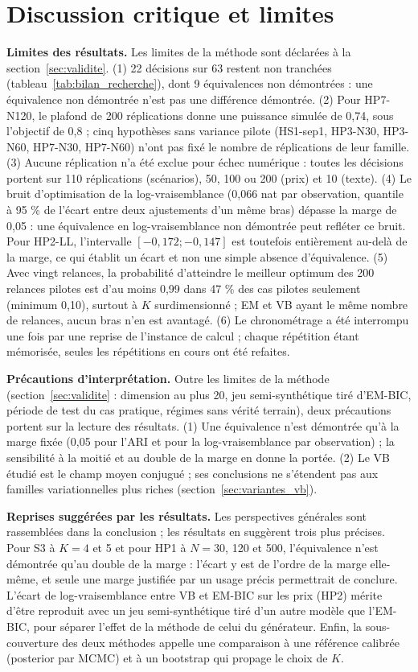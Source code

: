 \section{Discussion critique et limites}\label{sec:discussion_critique}
\textbf{Limites des résultats. }Les limites de la méthode sont déclarées à la section~\ref{sec:validite}.
(1) 22 décisions sur 63 restent non tranchées (tableau~\ref{tab:bilan_recherche}), dont 9 équivalences non démontrées : une équivalence non démontrée n'est pas une différence démontrée. (2) Pour HP7-N120, le plafond de 200 réplications donne une puissance simulée de 0,74, sous l'objectif de 0,8 ; cinq hypothèses sans variance pilote (HS1-sep1, HP3-N30, HP3-N60, HP7-N30, HP7-N60) n'ont pas fixé le nombre de réplications de leur famille. (3) Aucune réplication n'a été exclue pour échec numérique : toutes les décisions portent sur 110 réplications (scénarios), 50, 100 ou 200 (prix) et 10 (texte). (4) Le bruit d'optimisation de la log-vraisemblance (0,066 nat par observation, quantile à 95 \% de l'écart entre deux ajustements d'un même bras) dépasse la marge de 0,05 : une équivalence en log-vraisemblance non démontrée peut refléter ce bruit. Pour HP2-LL, l'intervalle $[-0{,}172 ; -0{,}147]$ est toutefois entièrement au-delà de la marge, ce qui établit un écart et non une simple absence d'équivalence. (5) Avec vingt relances, la probabilité d'atteindre le meilleur optimum des 200 relances pilotes est d'au moins 0,99 dans 47 \% des cas pilotes seulement (minimum 0,10), surtout à $K$ surdimensionné ; EM et VB ayant le même nombre de relances, aucun bras n'en est avantagé. (6) Le chronométrage a été interrompu une fois par une reprise de l'instance de calcul ; chaque répétition étant mémorisée, seules les répétitions en cours ont été refaites.

\textbf{Précautions d'interprétation. }Outre les limites de la méthode (section~\ref{sec:validite} : dimension au plus 20, jeu semi-synthétique tiré d'EM-BIC, période de test du cas pratique, régimes sans vérité terrain), deux précautions portent sur la lecture des résultats. (1) Une équivalence n'est démontrée qu'à la marge fixée (0,05 pour l'ARI et pour la log-vraisemblance par observation) ; la sensibilité à la moitié et au double de la marge en donne la portée. (2) Le VB étudié est le champ moyen conjugué ; ses conclusions ne s'étendent pas aux familles variationnelles plus riches (section~\ref{sec:variantes_vb}).

\textbf{Reprises suggérées par les résultats. }Les perspectives générales sont rassemblées dans la conclusion ; les résultats en suggèrent trois plus précises. Pour S3 à $K = 4$ et 5 et pour HP1 à $N = 30$, 120 et 500, l'équivalence n'est démontrée qu'au double de la marge : l'écart y est de l'ordre de la marge elle-même, et seule une marge justifiée par un usage précis permettrait de conclure. L'écart de log-vraisemblance entre VB et EM-BIC sur les prix (HP2) mérite d'être reproduit avec un jeu semi-synthétique tiré d'un autre modèle que l'EM-BIC, pour séparer l'effet de la méthode de celui du générateur. Enfin, la sous-couverture des deux méthodes appelle une comparaison à une référence calibrée (posterior par MCMC) et à un bootstrap qui propage le choix de $K$.

